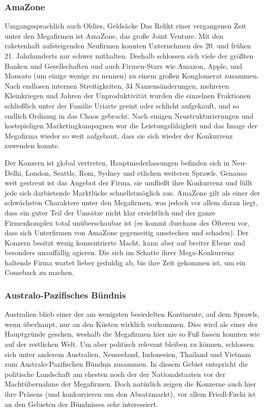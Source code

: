 \subsubsection{AmaZone}
Umgangssprachlich auch \glqq Oldies\grqq{}, \glqq Geldsäcke\grqq{}
Das Relikt einer vergangenen Zeit unter den Megafirmen ist AmaZone, das große Joint Venture. Mit den raketenhaft aufsteigenden Neufirmen konnten Unternehmen des 20. und frühen 21. Jahrhunderts nur schwer mithalten. Deshalb schlossen sich viele der größten Banken und Gesellschaften und auch \glqq Firmen-Stars\grqq{} wie Amazon, Apple, und Monsato (um einige wenige zu nennen) zu einem großen Konglomerat zusammen. Nach endlosen internen Streitigkeiten, 34 Namensänderungen, mehreren Kleinkriegen und Jahren der Unproduktivität wurden die einzelnen Fraktionen schließlich unter der Familie Uriarte geeint oder schlicht aufgekauft, und so endlich Ordnung in das Chaos gebracht. Nach einigen Neustrukturierungen und kostspieligen Marketingkampagnen war die Leistungsfähigkeit und das Image der Megafirma wieder so weit aufgebaut, dass sie sich wieder der Konkurrenz zuwenden konnte.

Der Konzern ist global vertreten, Hauptniederlassungen befinden sich in Neu-Delhi, London, Seattle, Rom, Sydney und etlichen weiteren Sprawls. Genauso weit gestreut ist das Angebot der Firma, sie \glqq umfließt\grqq{} ihre Konkurrenz und füllt jede sich darbietende Marktlücke schnellstmöglich aus.
AmaZone gilt als einer der \glqq schwächsten Charaktere\grqq{} unter den Megafirmen, was jedoch vor allem daran liegt, dass ein guter Teil der Umsätze nicht klar ersichtlich und der ganze Firmenkomplex total unüberschaubar ist (es kommt durchaus des Öfteren vor, dass sich Unterfirmen von AmaZone gegenseitig ausstechen und schaden). Der Konzern besitzt wenig konzentrierte Macht, kann aber auf breiter Ebene und besonders unauffällig agieren. Die sich im Schatte ihrer Mega-Konkurrenz haltende Firma wartet lieber geduldig ab, bis ihre Zeit gekommen ist, um ein Comeback zu machen.
\subsubsection{Australo-Pazifisches Bündnis}
Australien blieb einer der am wenigsten besiedelten Kontinente, auf dem Sprawls, wenn überhaupt, nur an den Küsten wirklich vorkommen. Dies wird als einer der Hauptgründe gesehen, weshalb die Megafirmen hier nie so Fuß fassen konnten wie auf der restlichen Welt. Um aber politisch relevant bleiben zu können, schlossen sich unter anderem Australien, Neuseeland, Indonesien, Thailand und Vietnam zum Australo-Pazifischen Bündnis zusammen. In diesem Gebiet entspricht die politische Landschaft am ehesten noch der der Nationalstaaten vor der Machtübernahme der Megafirmen. Doch natürlich zeigen die Konzerne auch hier ihre Präsens (und konkurrieren um den Absatzmarkt), vor allem Friedl-Fuchi ist an den Gebieten der Bündnisses sehr interessiert.

